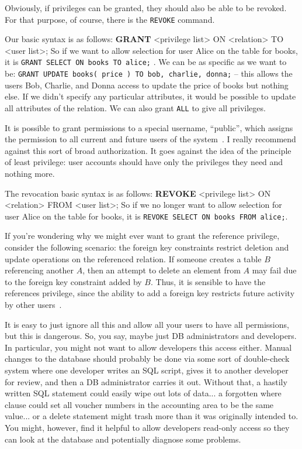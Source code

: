 \documentclass[a4paper]{report}
\begin{document}
Obviously, if privileges can be granted, they should also be able to be revoked. For that purpose, of course, there is the \texttt{REVOKE} command. 

Our basic syntax is as follows: \textbf{GRANT} <privilege list> ON <relation> TO <user list>; So if we want to allow selection for user Alice on the table for books, it is \texttt{GRANT SELECT ON books TO alice;} . We can be as specific as we want to be: \texttt{GRANT UPDATE books( price ) TO bob, charlie, donna;} -- this allows the users Bob, Charlie, and Donna access to update the price of books but nothing else. If we didn't specify any particular attributes, it would be possible to update all attributes of the relation. We can also grant \texttt{ALL} to give all privileges. 

It is possible to grant permissions to a special username, ``public'', which assigns the permission to all current and future users of the system~\cite{dsc}. I really recommend against this sort of broad authorization. It goes against the idea of the principle of least privilege: user accounts should have only the privileges they need and nothing more.

The revocation basic syntax is as follows: \textbf{REVOKE} <privilege list> ON <relation> FROM <user list>; So if we no longer want to allow selection for user Alice on the table for books, it is \texttt{REVOKE SELECT ON books FROM alice;}. 

If you're wondering why we might ever want to grant the reference privilege, consider the following scenario: the foreign key constraints restrict deletion and update operations on the referenced relation. If someone creates a table $B$ referencing another $A$, then an attempt to delete an element from $A$ may fail due to the foreign key constraint added by $B$. Thus, it is sensible to have the references privilege, since the ability to add a foreign key restricts future activity by other users~\cite{dsc}.

It is easy to just ignore all this and allow all your users to have all permissions, but this is dangerous. So, you say, maybe just DB administrators and developers. In particular, you might not want to allow developers this access either. Manual changes to the database should probably be done via some sort of double-check system where one developer writes an SQL script, gives it to another developer for review, and then a DB administrator carries it out. Without that, a hastily written SQL statement could easily wipe out lots of data... a forgotten where clause could set all voucher numbers in the accounting area to be the same value... or a delete statement might trash more than it was originally intended to. You might, however, find it helpful to allow developers read-only access so they can look at the database and potentially diagnose some problems.
\end{document}
